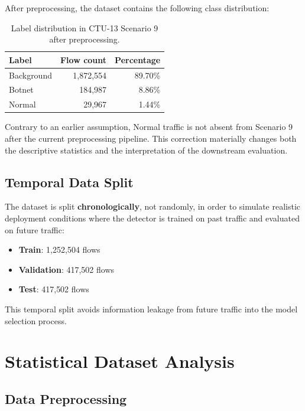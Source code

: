 \documentclass{article}
\begin{document}
After preprocessing, the dataset contains the following class distribution:

\begin{table}[h]
\centering
\begin{tabular}{lrr}
\toprule
\textbf{Label} & \textbf{Flow count} & \textbf{Percentage} \\
\midrule
Background & 1{,}872{,}554 & 89.70\% \\
Botnet     &   184{,}987   &  8.86\% \\
Normal     &    29{,}967   &  1.44\% \\
\bottomrule
\end{tabular}
\caption{Label distribution in CTU-13 Scenario 9 after preprocessing.}
\label{tab:class_distribution}
\end{table}

Contrary to an earlier assumption, Normal traffic is not absent from Scenario 9 after the current preprocessing pipeline. This correction materially changes both the descriptive statistics and the interpretation of the downstream evaluation.

\subsection{Temporal Data Split}

The dataset is split \textbf{chronologically}, not randomly, in order to simulate realistic deployment conditions where the detector is trained on past traffic and evaluated on future traffic:

\begin{itemize}
  \item \textbf{Train}: 1{,}252{,}504 flows
  \item \textbf{Validation}: 417{,}502 flows
  \item \textbf{Test}: 417{,}502 flows
\end{itemize}

This temporal split avoids information leakage from future traffic into the model selection process.

\section{Statistical Dataset Analysis}
\label{sec:stats}

\subsection{Data Preprocessing}
\end{document}
